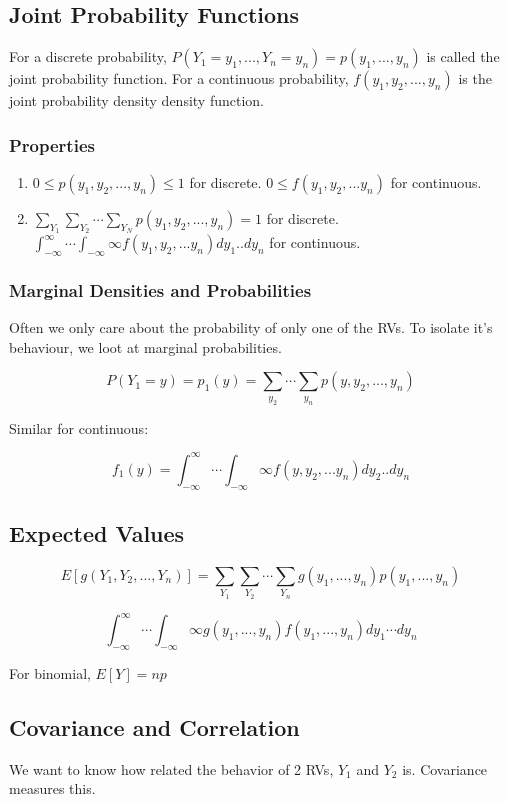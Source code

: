 \documentclass{article}
\begin{document}
\subsection{Joint Probability Functions}
For a discrete probability, $P(Y_1=y_1, ..., Y_n=y_n) = p(y_1,...,y_n)$ is
called the joint probability function. For a continuous probability,
$f(y_1,y_2,...,y_n)$ is the joint probability density density function.

\subsubsection{Properties}
\begin{enumerate}
  \item $0 \leq p(y_1,y_2,..., y_n) \leq 1$ for discrete.
    $0 \leq f(y_1,y_2,...y_n)$ for continuous.
  \item $\sum_{Y_1}\sum_{Y_2}\cdots\sum_{Y_N} p(y_1, y_2, ..., y_n) = 1$ for
    discrete.
    $\int_{-\infty}^{\infty}\cdots\int_{-\infty}{\infty} f(y_1, y_2,...y_n) dy_1..dy_n$
    for continuous.
\end{enumerate}

\subsubsection{Marginal Densities and Probabilities}
Often we only care about the probability of only one of the RVs. To isolate
it's behaviour, we loot at marginal probabilities.

\[ P(Y_1=y) = p_1(y) = \sum_{y_2}\cdots\sum_{y_n} p(y, y_2, ..., y_n) \]

Similar for continuous:

\[ f_1(y) = \int_{-\infty}^{\infty}\cdots\int_{-\infty}{\infty} f(y, y_2,...y_n) dy_2..dy_n \]

\subsection{Expected Values}
\[ E[g(Y_1, Y_2, ..., Y_n)] = \sum_{Y_1}\sum_{Y_2}\cdots\sum_{Y_n}
g(y_1,...,y_n) p(y_1, ..., y_n)\]

\[ \int_{-\infty}^{\infty}\cdots\int_{-\infty}{\infty} g(y_1,...,y_n)
f(y_1,...,y_n) dy_1 \cdots dy_n \]

For binomial, $E[Y] = np$
\subsection{Covariance and Correlation}
We want to know how related the behavior of 2 RVs, $Y_1$ and $Y_2$ is.
Covariance measures this.
\end{document}
